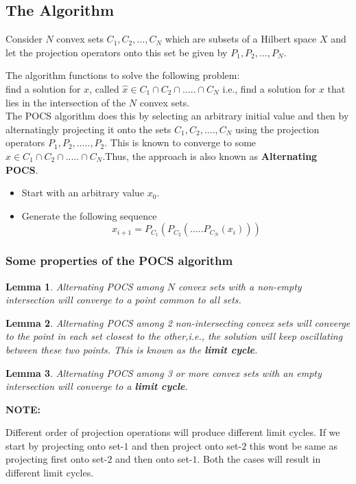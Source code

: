 \documentclass{article}
\newtheorem{lemma}{Lemma}[section]
\begin{document}
\subsection{The Algorithm}
Consider $N$ convex sets $C_1,C_2,...,C_N$ which are subsets of a Hilbert space $X$ and let the projection operators onto this set be given by $P_1,P_2,...,P_N$.\\
\begin{flushleft}
The algorithm functions to solve the following problem:\\
find a solution for $x$, called $\hat{x} \in C_1\cap C_2\cap.....\cap C_N$ i.e., find a solution for $x$ that lies in the intersection of the $N$ convex sets.\\
The POCS algorithm does this by selecting an arbitrary initial value and then by alternatingly projecting it onto the sets $C_1,C_2,....,C_N$ using the projection operators $P_1,P_2,.....,P_2$. This is known to converge to some $\hat{x} \in C_1\cap C_2\cap.....\cap C_N$.Thus, the approach is also known as \textbf{Alternating POCS}.
\end{flushleft}
\begin{itemize}
    \item Start with an arbitrary value $x_0$.
    \item Generate the following sequence
    \begin{equation}
        x_{i+1} = P_{C_1}(P_{C_2}(.....P_{C_N}(x_i)))
    \end{equation}
\end{itemize}
\subsubsection{Some properties of the POCS algorithm}
\begin{lemma}
Alternating POCS among $N$ convex sets with a non-empty intersection will converge to a point common to all sets.
\end{lemma}
\begin{lemma}
Alternating POCS among 2 non-intersecting convex sets will converge to the point in each set closest to the other,i.e., the solution will keep oscillating between these two points. This is known as the \textbf{limit cycle}.
\end{lemma}
\begin{lemma}
Alternating POCS among 3 or more convex sets with an empty intersection will converge to a \textbf{limit cycle}.\\
\end{lemma}
\begin{flushleft}
\textbf{NOTE:}
\end{flushleft}
Different order of projection operations will produce different limit cycles. If we start by projecting onto set-$1$ and then project onto set-$2$ this wont be same as projecting first onto set-$2$ and then onto set-$1$. Both the cases will result in different limit cycles.
\end{document}
